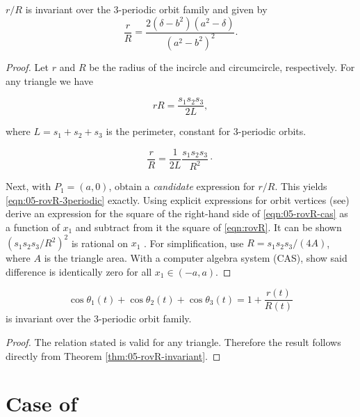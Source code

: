 \begin{theorem}
\label{thm:05-rovR-invariant}
$r/R$ is invariant over the 3-periodic orbit family and given by
\begin{equation}
\label{eqn:05-rovR-3periodic}
\frac{r}{R}=\frac{2 (\delta-b^2)(a^2-\delta)}{(a^2-b^2)^2}.
\end{equation}
\end{theorem}
\begin{proof}
Let $r$ and $R$ be the radius of the incircle and circumcircle, respectively. For any triangle \cite{coxeter67} we have

\begin{equation*}
 rR=\frac{s_1s_2s_3}{2 L}, 
\end{equation*}

\noindent where $L=s_1+s_2+s_3$ is the perimeter, constant for 3-periodic orbits. %

\begin{equation}
\frac{r}{R}=\frac{1}{2L} \frac{s_1s_2s_3}{R^2}\cdot
\label{eqn:05-rovR-cas}
\end{equation}

Next, with $P_1=(a,0)$, obtain a {\em candidate} expression for $r/R$. This yields \cref{eqn:05-rovR-3periodic} exactly. Using explicit expressions for orbit vertices (see) %
derive an expression for the square of the right-hand side of \cref{eqn:05-rovR-cas} as a function of $x_1$ and subtract from it the square of \cref{eqn:rovR}. It can be shown $\left(s_1s_2s_3/R^2\right)^2$ is rational on $x_1$ \cite{garcia2020-ellipses}. For simplification, use $R=s_1 s_2 s_3/(4A)$, where $A$ is the triangle area. With a computer algebra system (CAS), show said difference is identically zero for all $x_1\in(-a,a)$.
\end{proof}

\begin{corollary}
\[\cos\theta_1(t)+\cos\theta_2(t)+\cos\theta_3(t)=1+\frac{r(t)}{R(t)} \]
is invariant over the 3-periodic orbit family.
\end{corollary}

\begin{proof}
The relation stated is valid for any triangle. Therefore the result follows directly from Theorem \ref{thm:05-rovR-invariant}.
\end{proof}
\section{Case of }


